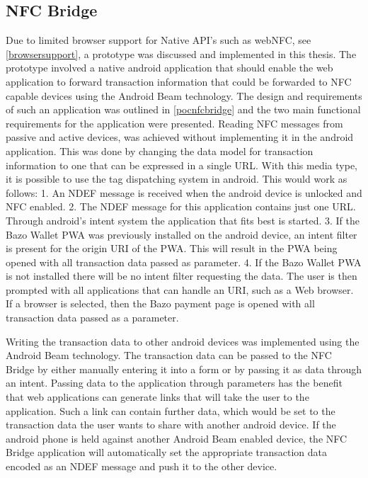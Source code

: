 \subsection{NFC Bridge}\label{nfcbridge}
Due to limited browser support for Native API's such as webNFC, see \ref{browsersupport}, a prototype was discussed and implemented in this thesis. The prototype involved a native android application that should enable the web application to forward transaction information that could be forwarded to NFC capable devices using the Android Beam technology.
The design and requirements of such an application was outlined in \ref{pocnfcbridge} and the two main functional requirements for the application were presented.
Reading NFC messages from passive and active devices, was achieved without implementing it in the android application. This was done by changing the data model for transaction information to one that can be expressed in a single URL. With this media type, it is possible to use the tag dispatching system in android. This would work as follows:
1. An NDEF message is received when the android device is unlocked and NFC enabled.
2. The NDEF message for this application contains just one URL. Through android's intent system the application that fits best is started.
3. If the Bazo Wallet PWA was previously installed on the android device, an intent filter is present for the origin URI of the PWA. This will result in the PWA being opened with all transaction data passed as parameter.
4. If the Bazo Wallet PWA is not installed there will be no intent filter requesting the data. The user is then prompted with all applications that can handle an URI, such as a Web browser. If a browser is selected, then the Bazo payment page is opened with all transaction data passed as a parameter.

Writing the transaction data to other android devices was implemented using the Android Beam technology.
The transaction data can be passed to the NFC Bridge by either manually entering it into a form or by passing it as data through an intent. Passing data to the application through parameters has the benefit that web applications can generate links that will take the user to the application. Such a link can contain further data, which would be set to the transaction data the user wants to share with another android device.
If the android phone is held against another Android Beam enabled device, the NFC Bridge application will automatically set the appropriate transaction data encoded as an NDEF message and push it to the other device.

